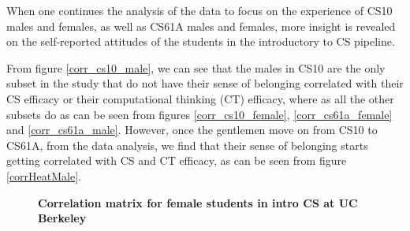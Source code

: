 \documentclass[twoside,openright,titlepage,numbers=noenddot,headinclude,%
               footinclude=true,cleardoublepage=empty,abstractoff,BCOR=5mm,%
               paper=a4,fontsize=11pt,ngerman,american]{scrreprt}
\numberwithin{theorem}{chapter}
\numberwithin{definition}{chapter}
\numberwithin{algorithm}{chapter}
\numberwithin{figure}{chapter}
\numberwithin{table}{chapter}
\numberwithin{equation}{chapter}
\begin{document}
When one continues the analysis of the data to focus on the experience of CS10 males and females, as well as CS61A males and females, more insight is revealed on the self-reported attitudes of the students in the introductory to CS pipeline.

From figure \ref{corr_cs10_male}, we can see that the males in CS10 are the only subset in the study that do not have their sense of belonging correlated with their CS efficacy or their computational thinking (CT) efficacy, where as all the other subsets do as can be seen from figures \ref{corr_cs10_female}, \ref{corr_cs61a_female} and \ref{corr_cs61a_male}. However, once the gentlemen move on from CS10 to CS61A, from the data analysis, we find that their sense of belonging starts getting correlated with CS and CT efficacy, as can be seen from figure \ref{corrHeatMale}.

\begin{figure}[!htbp]
    \centering
%
\caption {\textbf{Correlation matrix for female students in intro CS at UC Berkeley}}
\label{fig:corrFemale}
\end{figure}
\end{document}
